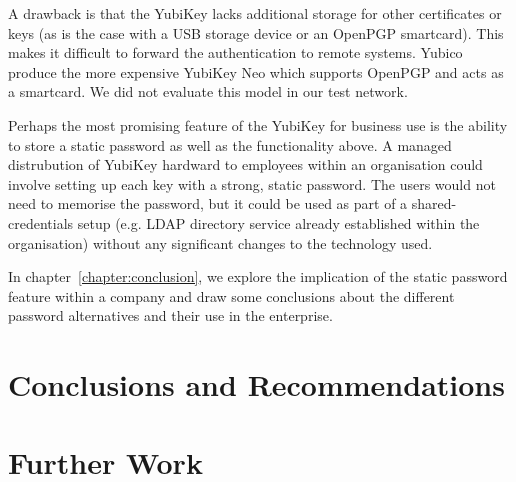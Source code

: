 \documentclass{report}
\begin{document}
A drawback is that the YubiKey lacks additional storage for other certificates
or keys (as is the case with a USB storage device or an OpenPGP smartcard). This
makes it difficult to forward the authentication to remote systems. Yubico
produce the more expensive YubiKey Neo which supports OpenPGP and acts as
a smartcard. We did not evaluate this model in our test network.

Perhaps the most promising feature of the YubiKey for business use is the
ability to store a static password as well as the functionality above. A
managed distrubution of YubiKey hardward to employees within an organisation
could involve setting up each key with a strong, static password. The users
would not need to memorise the password, but it could be used as part of
a shared-credentials setup (e.g. LDAP directory service already established
within the organisation) without any significant changes to the technology
used.

In chapter~\ref{chapter:conclusion}, we explore the implication of the
static password feature within a company and draw some conclusions about the
different password alternatives and their use in the enterprise.

\chapter{Conclusions and Recommendations}



\chapter{Further Work}

\printbibliography
\end{document}
